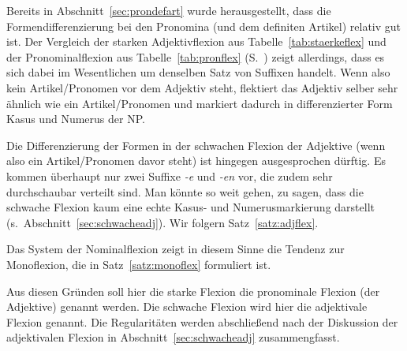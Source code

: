 Bereits in Abschnitt~\ref{sec:prondefart} wurde herausgestellt, dass die Formendifferenzierung bei den Pronomina (und dem definiten Artikel) relativ gut ist.
Der Vergleich der starken Adjektivflexion aus Tabelle~\ref{tab:staerkeflex} und der Pronominalflexion aus Tabelle~\ref{tab:pronflex} (S.~\pageref{tab:pronflex}) zeigt allerdings, dass es sich dabei im Wesentlichen um denselben Satz von Suffixen handelt.
Wenn also kein Artikel\slash Pronomen vor dem Adjektiv steht, flektiert das Adjektiv selber sehr ähnlich wie ein Artikel\slash Pronomen und markiert dadurch in differenzierter Form Kasus und Numerus der NP.

Die Differenzierung der Formen in der schwachen Flexion der Adjektive (wenn also ein Artikel\slash Pronomen davor steht) ist hingegen ausgesprochen dürftig.
Es kommen überhaupt nur zwei Suffixe \textit{-e} und \textit{-en} vor, die zudem sehr durchschaubar verteilt sind.
Man könnte so weit gehen, zu sagen, dass die schwache Flexion kaum eine echte Kasus- und Numerusmarkierung darstellt (s.\ Abschnitt~\ref{sec:schwacheadj}).
Wir folgern Satz~\ref{satz:adjflex}.



\newpage

Das System der Nominalflexion zeigt in diesem Sinne die Tendenz zur Monoflexion, die in Satz~\ref{satz:monoflex} formuliert ist.


Aus diesen Gründen soll hier die starke Flexion die pronominale Flexion (der Adjektive) genannt werden.
Die schwache Flexion wird hier die adjektivale Flexion genannt.
Die Regularitäten werden abschließend nach der Diskussion der adjektivalen Flexion in Abschnitt~\ref{sec:schwacheadj} zusammengfasst.

